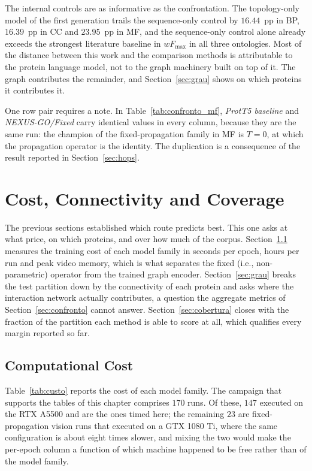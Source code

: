 \documentclass[Ingles]{ic-tese-v3}
\begin{document}
The internal controls are as informative as the confrontation. The topology-only model of
the first generation trails the sequence-only control by $16.44$~pp in BP, $16.39$~pp in CC
and $23.95$~pp in MF, and the sequence-only control alone already exceeds the strongest
literature baseline in $wF_{\max}$ in all three ontologies. Most of the distance between this work and the
comparison methods is attributable to the protein language model, not to the graph
machinery built on top of it. The graph contributes the remainder, and
Section~\ref{sec:grau} shows on which proteins it contributes it.

One row pair requires a note. In Table~\ref{tab:confronto_mf}, \emph{ProtT5 baseline} and
\emph{NEXUS-GO/Fixed} carry identical values in every column, because they
are the same run: the
champion of the fixed-propagation family in MF is $T=0$, at which the propagation operator
is the identity. The duplication is a consequence of the result reported in
Section~\ref{sec:hops}.


\section{Cost, Connectivity and Coverage}
\label{sec:analise}

The previous sections established which route predicts best. This one asks at what price, on
which proteins, and over how much of the corpus. Section~\ref{sec:custo} measures the
training cost of each model family in seconds per epoch, hours per run and peak video memory,
which is what separates the fixed (i.e., non-parametric) operator from the trained graph encoder.
Section~\ref{sec:grau} breaks the test partition down by the connectivity of each protein and
asks where the interaction network actually contributes, a question the aggregate metrics of
Section~\ref{sec:confronto} cannot answer. Section~\ref{sec:cobertura} closes with the
fraction of the partition each method is able to score at all, which qualifies every margin
reported so far.

\subsection{Computational Cost}
\label{sec:custo}

Table~\ref{tab:custo} reports the cost of each model family. The campaign that supports the
tables of this chapter comprises $170$ runs. Of these, $147$ executed on the RTX A5500 and
are the ones timed here; the remaining $23$ are fixed-propagation vision runs that executed
on a GTX 1080 Ti, where the same configuration is about eight times slower, and mixing the
two would make the per-epoch column a function of which machine happened to be free rather
than of the model family.
\end{document}
